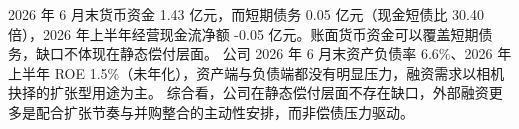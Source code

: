  2026 年 6 月末货币资金 1.43 亿元，而短期债务 0.05 亿元（现金短债比 30.40 倍），2026 年上半年经营现金流净额 -0.05 亿元。账面货币资金可以覆盖短期债务，缺口不体现在静态偿付层面。 公司 2026 年 6 月末资产负债率 6.6\%、2026 年上半年 ROE 1.5\%（未年化），资产端与负债端都没有明显压力，融资需求以相机抉择的扩张型用途为主。 综合看，公司在静态偿付层面不存在缺口，外部融资更多是配合扩张节奏与并购整合的主动性安排，而非偿债压力驱动。




